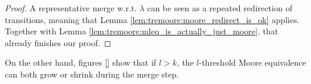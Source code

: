 \begin{proof}
	A representative merge w.r.t. $\lambda$ can be seen as a repeated redirection of transitions, meaning that Lemma \ref{lem:tremoore:moore_redirect_is_ok} applies. Together with Lemma \ref{lem:tremoore:mleq_is_actually_just_moore}, that already finishes our proof.
\end{proof}

\vspace{10pt}


On the other hand, figures \ref{} show that if $l > k$, the $l$-threshold Moore equivalence can both grow or shrink during the merge step. %



























